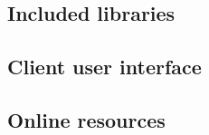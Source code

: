 \subsection{Included libraries}
    

\subsection{Client user interface}
    

\subsection{Online resources}
    